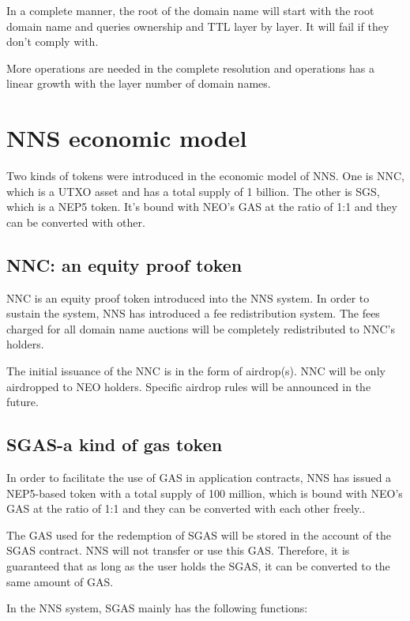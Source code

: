 \documentclass[letterpaper,10pt,english]{sphinxmanual}
\begin{document}

In a complete manner, the root of the domain name will start with the root domain name and queries ownership and TTL layer by layer. It will fail if they don’t comply with.

More operations are needed in the complete resolution and operations has a linear growth with the layer number of domain names.


\section{NNS economic model}
\label{\detokenize{nns_system:nns-economic-model}}
Two kinds of tokens were introduced in the economic model of NNS. One is NNC, which is a UTXO asset and has a total supply of 1 billion. The other is SGS, which is
a NEP5 token. It’s bound with NEO’s GAS at the ratio of 1:1 and they can be converted with other.


\subsection{NNC: an equity proof token}
\label{\detokenize{nns_system:nnc-an-equity-proof-token}}
NNC is an equity proof token introduced into the NNS system. In order to sustain the system, NNS has introduced a fee redistribution system. The fees charged for all domain name auctions will be completely redistributed to NNC’s holders.

The initial issuance of the NNC is in the form of airdrop(s). NNC will be only airdropped to NEO holders. Specific airdrop rules will be announced in the future.


\subsection{SGAS-a kind of gas token}
\label{\detokenize{nns_system:sgas-a-kind-of-gas-token}}
In order to facilitate the use of GAS in application contracts, NNS has issued a NEP5-based token with a total supply of 100 million, which is  bound with NEO’s GAS at the ratio of 1:1 and they can be converted with each other freely..

The GAS used for the redemption of SGAS will be stored in the account of the SGAS contract. NNS will not transfer or use this GAS. Therefore, it is guaranteed that as long as the user holds the SGAS, it can be converted to the same amount of GAS.

In the NNS system, SGAS mainly has the following functions:
\end{document}

